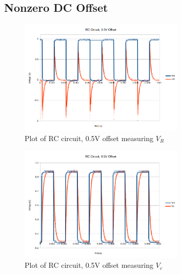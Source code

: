 \documentclass[10pt]{article}
\begin{document}
\subsection*{Nonzero DC Offset}
\begin{figure}[H]
	\centering
	\includegraphics[width=0.7\textwidth]{RC_Offset_R}
	\caption{Plot of RC circuit, 0.5V offset measuring $V_R$}
\end{figure}
\begin{figure}[H]
	\centering
	\includegraphics[width=0.7\textwidth]{RC_Offset_C}
	\caption{Plot of RC circuit, 0.5V offset measuring $V_c$}
\end{figure}
\end{document}
